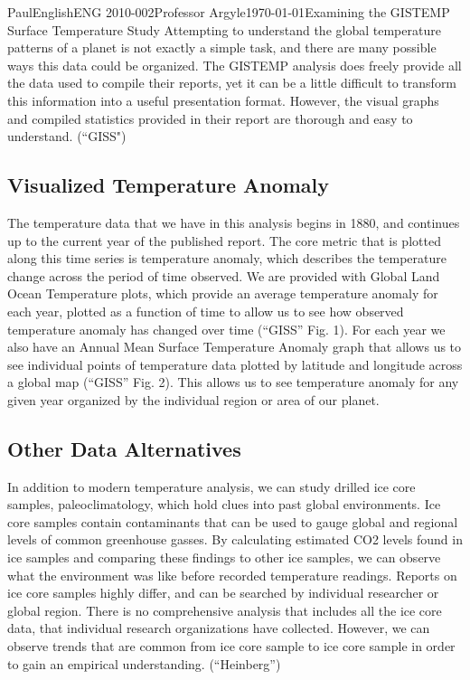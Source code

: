 \documentclass[12pt,letterpaper]{article}
\begin{document}
\begin{mla}{Paul}{English}{ENG 2010-002}{Professor Argyle}{\today}{Examining the GISTEMP Surface Temperature Study}
Attempting to understand the global temperature patterns of a planet is not exactly a simple task, and there are many possible ways this data could be organized. The GISTEMP analysis does freely provide all the data used to compile their reports, yet it can be a little difficult to transform this information into a useful presentation format. However, the visual graphs and compiled statistics provided in their report are thorough and easy to understand. (``GISS")

\subsection{Visualized Temperature Anomaly}
The temperature data that we have in this analysis begins in 1880, and continues up to the current year of the published report. The core metric that is plotted along this time series is temperature anomaly, which describes the temperature change across the period of time observed. We are provided with Global Land Ocean Temperature plots, which provide an average temperature anomaly for each year, plotted as a function of time to allow us to see how observed temperature anomaly has changed over time (``GISS'' Fig. 1). For each year we also have an Annual Mean Surface Temperature Anomaly graph that allows us to see individual points of temperature data plotted by latitude and longitude across a global map (``GISS'' Fig. 2). This allows us to see temperature anomaly for any given year organized by the individual region or area of our planet.

\subsection{Other Data Alternatives}
In addition to modern temperature analysis, we can study drilled ice core samples, paleoclimatology, which hold clues into past global environments. Ice core samples contain contaminants that can be used to gauge global and regional levels of common greenhouse gasses. By calculating estimated CO2 levels found in ice samples and comparing these findings to other ice samples, we can observe what the environment was like before recorded temperature readings. Reports on ice core samples highly differ, and can be searched by individual researcher or global region. There is no comprehensive analysis that includes all the ice core data, that individual research organizations have collected. However, we can observe trends that are common from ice core sample to ice core sample in order to gain an empirical understanding. (``Heinberg'')


\end{mla}
\end{document}
